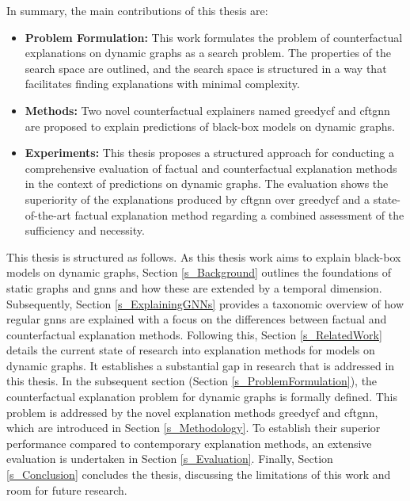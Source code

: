 In summary, the main contributions of this thesis are:

\begin{itemize}
    \item \textbf{Problem Formulation:} This work formulates the problem of counterfactual explanations on dynamic graphs as a search problem. The properties of the search space are outlined, and the search space is structured in a way that facilitates finding explanations with minimal complexity.

    \item \textbf{Methods:} Two novel counterfactual explainers named \gls{greedycf} and \gls{cftgnn} are proposed to explain predictions of black-box models on dynamic graphs.

    \item \textbf{Experiments:} This thesis proposes a structured approach for conducting a comprehensive evaluation of factual and counterfactual explanation methods in the context of predictions on dynamic graphs. The evaluation shows the superiority of the explanations produced by \gls{cftgnn} over \gls{greedycf} and a state-of-the-art factual explanation method regarding a combined assessment of the sufficiency and necessity.
    
\end{itemize}


This thesis is structured as follows. As this thesis work aims to explain black-box models on dynamic graphs, Section \ref{s_Background} outlines the foundations of static graphs and \glspl{gnn} and how these are extended by a temporal dimension. Subsequently, Section \ref{s_ExplainingGNNs} provides a taxonomic overview of how regular \glspl{gnn} are explained with a focus on the differences between factual and counterfactual explanation methods. Following this, Section \ref{s_RelatedWork} details the current state of research into explanation methods for models on dynamic graphs. It establishes a substantial gap in research that is addressed in this thesis. In the subsequent section (Section \ref{s_ProblemFormulation}), the counterfactual explanation problem for dynamic graphs is formally defined. This problem is addressed by the novel explanation methods \gls{greedycf} and \gls{cftgnn}, which are introduced in Section \ref{s_Methodology}. To establish their superior performance compared to contemporary explanation methods, an extensive evaluation is undertaken in Section \ref{s_Evaluation}. Finally, Section \ref{s_Conclusion} concludes the thesis, discussing the limitations of this work and room for future research.


